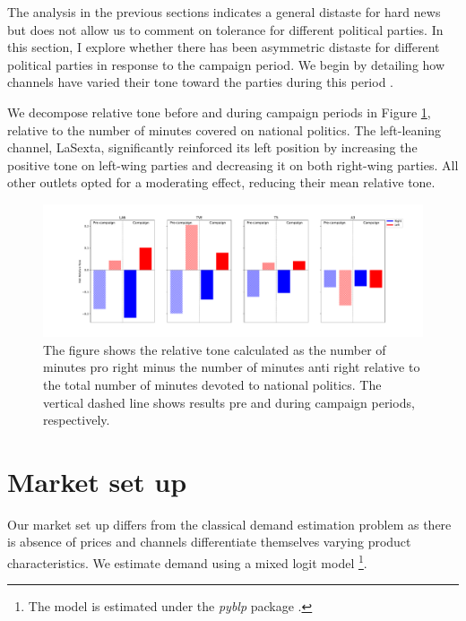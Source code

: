 \documentclass[12pt]{article}
\begin{document}
	The analysis in the previous sections indicates a general distaste for hard news but does not allow us to comment on tolerance for different political parties. In this section, I explore whether there has been asymmetric distaste for different political parties in response to the campaign period. We begin by detailing how channels have varied their tone toward the parties during this period \citep{independent2023vox}.
	
	We decompose relative tone before and during campaign periods in Figure \ref{fig:tone2}, relative to the number of minutes covered on national politics. The left-leaning channel, LaSexta, significantly reinforced its left position by increasing the positive tone on left-wing parties and decreasing it on both right-wing parties. All other outlets opted for a moderating effect, reducing their mean relative tone.
	
	\begin{figure}[h!]
		\centering
		\includegraphics[width=180mm]{figures/average_tone_pre_post_election}
		\caption{The figure shows the relative tone calculated as the number of minutes pro right minus the number of minutes anti right relative to the total number of minutes devoted to national politics. The vertical dashed line shows results pre and during campaign periods, respectively. }
		\label{fig:tone2}
	\end{figure}
	
	
	
	
	
	\section{Market set up}\label{section:market}
	
	Our market set up differs from the classical demand estimation problem as there is absence of prices and channels differentiate themselves varying product characteristics. We estimate demand using a mixed logit model \citep{berry1994estimating} \footnote{The model is estimated under the \textit{pyblp} package \citep{conlon2020best}.}.
	
\end{document}
